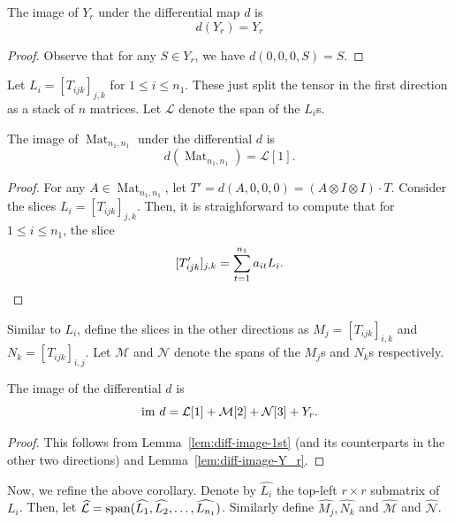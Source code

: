 \documentclass[10pt,a4paper]{article}
\theoremstyle{definition}
\theoremstyle{remark}
\newcommand{\spa}{{\rm span}}
\newcommand{\Mat}{\operatorname{Mat}}
\newcommand{\im}{{\rm im}}
\begin{document}
\begin{lemma} \label{lem:diff-image-Y_r}
The image of $Y_r$ under the differential map $d$ is 
$$
d(Y_r) = Y_r
$$
\end{lemma}
\begin{proof}
Observe that for any $S \in Y_r$, we have $d(0,0,0,S) = S$. 
\end{proof}

Let $L_i = [T_{ijk}]_{j,k} $ for $1 \leq i \leq n_1$. These just split the tensor in the first direction as a stack of $n$ matrices. Let $\mathcal{L}$ denote the span of the $L_i$s.

\begin{lemma} \label{lem:diff-image-1st}
The image of $\Mat_{n_1,n_1}$ under the differential $d$ is
\begin{equation} \label{eq:image-differential-linear}
d(\Mat_{n_1,n_1}) = \mathcal{L}[1].
\end{equation}
\end{lemma}


\begin{proof}
For any $A \in \Mat_{n_1,n_1}$, let $T' = d(A,0,0,0) = (A \otimes I \otimes I) \cdot T$. Consider the slices $L_i = [T_{ijk}]_{j,k} $. Then, it is straighforward to compute that for $1 \leq i \leq n_1$, the slice
\[
[T'_{ijk}]_{j,k}= \sum_{t = 1}^{n_1} a_{it} L_i.\qedhere
\]
\end{proof}

Similar to $L_i$, define the slices in the other directions as $M_j = [T_{ijk}]_{i,k}$ and $N_k = [T_{ijk}]_{i,j}$. Let $\mathcal{M}$ and $\mathcal{N}$ denote the spans of the $M_j$s and $N_k$s respectively.

\begin{corollary} \label{cor:image-d}
The image of the differential $d$ is
$$
\im\ d = \mathcal{L}[1] + \mathcal{M}[2] + \mathcal{N}[3] + Y_r.
$$
\end{corollary}

\begin{proof}
This follows from 
Lemma~\ref{lem:diff-image-1st} (and its counterparts in the other two directions) and Lemma~\ref{lem:diff-image-Y_r}.
\end{proof}

Now, we refine the above corollary. Denote by $\widehat{L_i}$ the top-left $ r \times r$ submatrix of $L_i$. Then, let $\mathcal{\widehat{L}} = \spa (\widehat{L_1}, \widehat{L_2} ,\dots, \widehat{L_{n_1}})$. Similarly define $\widehat{M_j}, \widehat{N_k}$ and $\mathcal{\widehat{M}}$ and $\mathcal{\widehat{N}}$.
\end{document}
